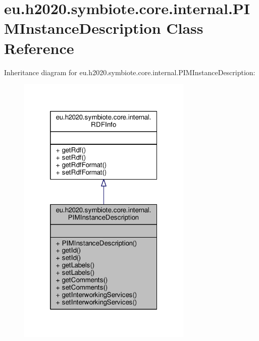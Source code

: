 \hypertarget{classeu_1_1h2020_1_1symbiote_1_1core_1_1internal_1_1PIMInstanceDescription}{}\section{eu.\+h2020.\+symbiote.\+core.\+internal.\+P\+I\+M\+Instance\+Description Class Reference}
\label{classeu_1_1h2020_1_1symbiote_1_1core_1_1internal_1_1PIMInstanceDescription}


Inheritance diagram for eu.\+h2020.\+symbiote.\+core.\+internal.\+P\+I\+M\+Instance\+Description\+:\nopagebreak
\begin{figure}[H]
\begin{center}
\leavevmode
\includegraphics[width=236pt]{classeu_1_1h2020_1_1symbiote_1_1core_1_1internal_1_1PIMInstanceDescription__inherit__graph}
\end{center}
\end{figure}


